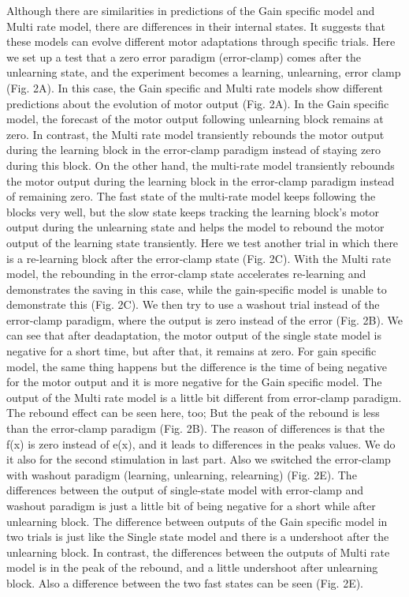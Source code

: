 \documentclass[9pt,twocolumn]{paper-template}
\begin{document}
Although there are similarities in predictions of the Gain specific model and Multi rate model, there are differences in their internal states. It suggests that these models can evolve different motor adaptations through specific trials. Here we set up a test that a zero error paradigm (error-clamp) comes after the unlearning state, and the experiment becomes a learning, unlearning, error clamp (Fig. 2A). In this case, the Gain specific and Multi rate models show different predictions about the evolution of motor output (Fig. 2A). In the Gain specific model, the forecast of the motor output following unlearning block remains at zero.
In contrast, the Multi rate model transiently rebounds the motor output during the learning block in the error-clamp paradigm instead of staying zero during this block. On the other hand, the multi-rate model transiently rebounds the motor output during the learning block in the error-clamp paradigm instead of remaining zero. The fast state of the multi-rate model keeps following the blocks very well, but the slow state keeps tracking the learning block's motor output during the unlearning state and helps the model to rebound the motor output of the learning state transiently. Here we test another trial in which there is a re-learning block after the error-clamp state (Fig. 2C). With the Multi rate model, the rebounding in the error-clamp state accelerates re-learning and demonstrates the saving in this case, while the gain-specific model is unable to demonstrate this (Fig. 2C).
We then try to use a washout trial instead of the error-clamp paradigm, where the output is zero instead of the error (Fig. 2B). We can see that after deadaptation, the motor output of the single state model is negative for a short time, but after that, it remains at zero. For gain specific model, the same thing happens but the difference is the time of being negative for the motor output and it is more negative for the Gain specific model. The output of the Multi rate model is a little bit different from error-clamp paradigm. The rebound effect can be seen here, too; But the peak of the rebound is less than the error-clamp paradigm (Fig. 2B). The reason of differences is that the f(x) is zero instead of e(x), and it leads to differences in the peaks values. We do it also for the second stimulation in last part. Also we switched the error-clamp with washout paradigm (learning, unlearning, relearning) (Fig. 2E). The differences between the output of single-state model with error-clamp and washout paradigm is just a little bit of being negative for a short while after unlearning block. The difference between outputs of the Gain specific model in two trials is just like the Single state model and there is a undershoot after the unlearning block. In contrast, the differences between the outputs of Multi rate model is in the peak of the rebound, and a little undershoot after unlearning block. Also a difference between the two fast states can be seen (Fig. 2E).
\end{document}
